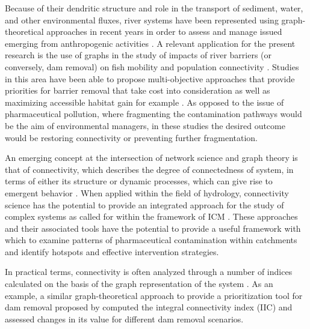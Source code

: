 \documentclass{article}
\begin{document}
Because of their dendritic structure and role in the transport of sediment, water, and other environmental fluxes, river systems have been represented using graph-theoretical approaches in recent years in order to assess and manage issued emerging from anthropogenic activities \citep{Abed-Elmdoust2016ReorganizationApproach,Abed-Elmdoust2017EmergentApproach,Cieplak1998ModelsBasins,Eros2011NetworkApproach,Tejedor2015DeltaSurfaces}. A relevant application for the present research is the use of graphs in the study of impacts of river barriers (or conversely, dam removal) on fish mobility and population connectivity \citep{Sarker2019CriticalNetworks,Schick2007DirectedNetwork,Segurado2013PrioritizingApproach}. Studies in this area have been able to propose multi-objective approaches that provide priorities for barrier removal that take cost into consideration as well as maximizing accessible habitat gain for example \citep{OHanley2005OptimizingBarriers}. As opposed to the issue of pharmaceutical pollution, where fragmenting the contamination pathways would be the aim of environmental managers, in these studies the desired outcome would be restoring connectivity or preventing further fragmentation.

An emerging concept at the intersection of network science and graph theory is that of connectivity, which describes the degree of connectedness of system, in terms of either its structure or dynamic processes, which can give rise to emergent behavior \citep{Turnbull2018ConnectivityPerspective}. When applied within the field of hydrology, connectivity science has the potential to provide an integrated approach for the study of complex systems as called for within the framework of ICM  \citep{Lexartza-Artza2009HydrologicalImplications}. These approaches and their associated tools have the potential to provide a useful framework with which to examine patterns of pharmaceutical contamination within catchments and identify hotspots and effective intervention strategies.

In practical terms, connectivity is often analyzed through a number of indices calculated on the basis of the graph representation of the system \citep{Ali2010ShoppingCatchment,Heckmann2018IndicesLimitations}.  As an example, a similar graph-theoretical approach to provide a prioritization tool for dam removal proposed by \citet{Segurado2013PrioritizingApproach} computed the integral connectivity index (IIC) and assessed changes in its value for different dam removal scenarios.
\end{document}
